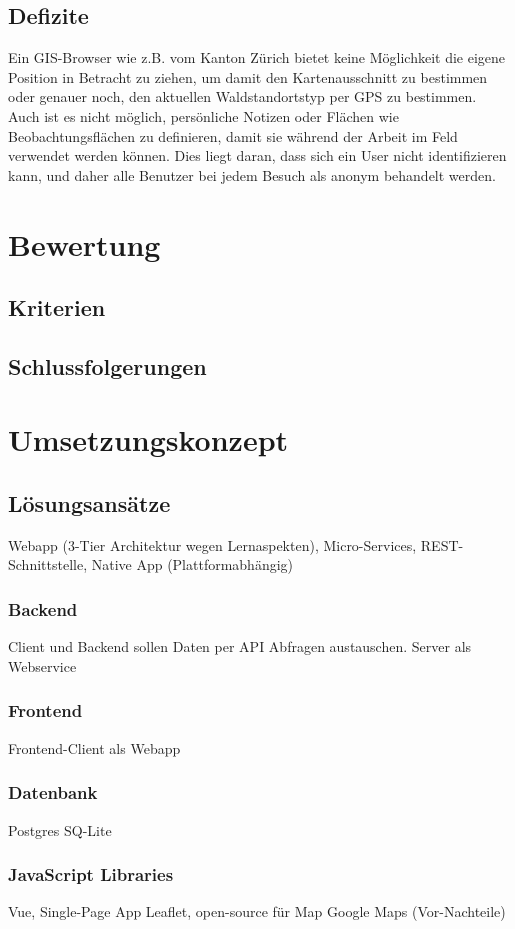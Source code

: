 \subsection{Defizite}
Ein GIS-Browser wie z.B. vom Kanton Z\"urich bietet keine M\"oglichkeit die eigene Position in Betracht zu ziehen, um damit den Kartenausschnitt zu bestimmen oder genauer noch, den aktuellen Waldstandortstyp per GPS zu bestimmen. Auch ist es nicht m\"oglich, pers\"onliche Notizen oder Fl\"achen wie Beobachtungsfl\"achen zu definieren, damit sie w\"ahrend der Arbeit im Feld verwendet werden k\"onnen. Dies liegt daran, dass sich ein User nicht identifizieren kann, und daher alle Benutzer bei jedem Besuch als anonym behandelt werden.

\section{Bewertung}
\subsection{Kriterien}
\subsection{Schlussfolgerungen}

\section{Umsetzungskonzept}
\subsection{L\"osungsans\"atze}
Webapp (3-Tier Architektur wegen Lernaspekten), Micro-Services, REST-Schnittstelle,  
Native App (Plattformabh\"angig)
\subsubsection{Backend}
Client und Backend sollen Daten per API Abfragen austauschen.
Server als Webservice
\subsubsection{Frontend}
Frontend-Client als Webapp
\subsubsection{Datenbank}
Postgres
SQ-Lite
\subsubsection{JavaScript Libraries}
Vue, Single-Page App
Leaflet, open-source f\"ur Map
Google Maps (Vor-Nachteile)
